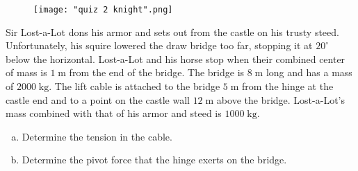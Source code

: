 \documentclass{article}
\begin{document}
\insertTitle

\begin{figure}[H]
\centering
\texttt{[image: "quiz 2 knight".png]}
\end{figure}

Sir Lost-a-Lot dons his armor and sets out from the castle on his trusty steed. Unfortunately, his squire lowered the draw bridge too far, stopping it at $20^\circ$ below the horizontal. Lost-a-Lot and his horse stop when their combined center of mass is $1\phantom{.}\text{m}$ from the end of the bridge. The bridge is $8\phantom{.}\text{m}$ long and has a mass of $2000\phantom{.}\text{kg}$. The lift cable is attached to the bridge $5\phantom{.}\text{m}$ from the hinge at the castle end and to a point on the castle wall $12\phantom{.}\text{m}$ above the bridge. Lost-a-Lot's mass combined with that of his armor and steed is $1000\phantom{.}\text{kg}$.

\begin{enumerate}[(a)]
    \item Determine the tension in the cable.
    \vfill
    \item Determine the pivot force that the hinge exerts on the bridge.
    \vfill
\end{enumerate}
\end{document}
